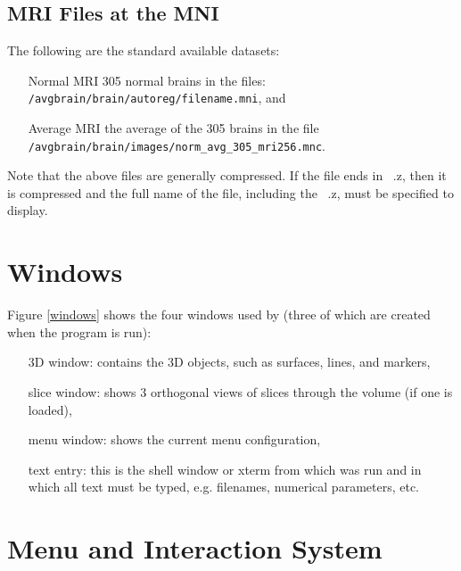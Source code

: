 \subsection{MRI Files at the MNI}

The following are the standard available datasets:

\begin{itemize}
\item[Normal MRI] 305 normal brains in the files:  {\tt /avgbrain/brain/autoreg/filename.mni}, and
\item[Average MRI] the average of the 305 brains in the file {\tt /avgbrain/brain/images/norm\_avg\_305\_mri256.mnc}.
\end{itemize}

Note that the above files are generally compressed.  If the file ends in
\ .z, then it is compressed and the full name of the file, including the
\ .z, must be specified to display.

\section{\display Windows}


Figure \ref{windows} shows the four windows used by \display (three of which
are created when the program is run):

\begin{itemize}
\item[3D window:]  contains the 3D objects, such as surfaces, lines,
                  and markers,
\item[slice window:]  shows 3 orthogonal views of slices through the volume
                     (if one is loaded),
\item[menu window:]  shows the current menu configuration,
\item[text entry:]  this is the shell window or xterm from which \display was
                   run and in which all text must be typed, e.g. filenames,
                   numerical parameters, etc.
\end{itemize}

\section{Menu and Interaction System}

